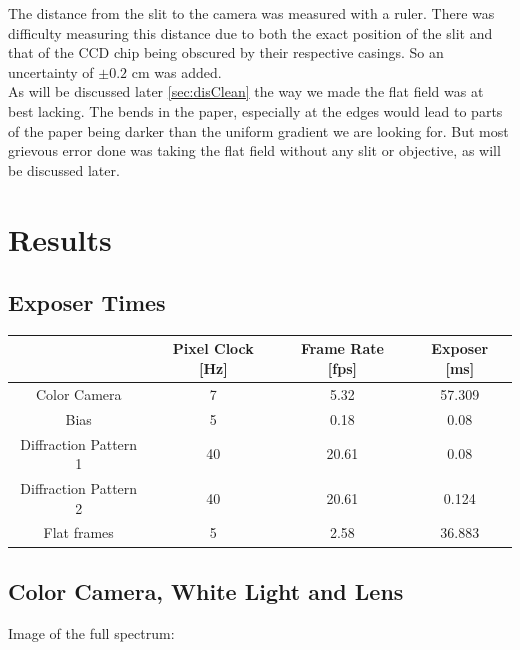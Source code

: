 \documentclass{emulateapj}
\begin{document}
The distance from the slit to the camera was measured with a ruler. There was difficulty measuring this distance due to both the exact position of the slit and that of the CCD chip being obscured by their respective casings. So an uncertainty of $\pm 0.2$ cm was added.\\

As will be discussed later \ref{sec:disClean} the way we made the flat field was at best lacking. The bends in the paper, especially at the edges would lead to parts of the paper being darker than the uniform gradient we are looking for. But most grievous error done was taking the flat field without any slit or objective, as will be discussed later.




 
\section{Results}
\label{sec:results}

\subsection{Exposer Times}
\begin{table}[H]
\centering
\begin{tabular}{c|c|c|c}
 & Pixel Clock [Hz] & Frame Rate [fps] & Exposer [ms]\\
 \hline
Color Camera & 7 & 5.32 & 57.309\\
Bias & 5 & 0.18 & 0.08\\
Diffraction Pattern 1 & 40 & 20.61 & 0.08 \\ 
Diffraction Pattern 2 & 40 & 20.61 & 0.124 \\
Flat frames & 5 & 2.58 & 36.883
\end{tabular}
\end{table}


\subsection{Color Camera, White Light and Lens}
\label{sec:resColor}
Image of the full spectrum:
\end{document}
